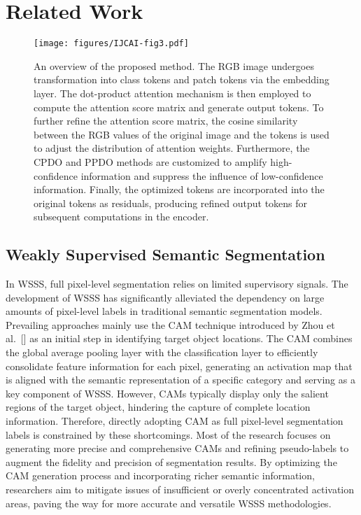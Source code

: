 \section{Related Work}
\begin{figure*}[t] 
    \centering
    \texttt{[image: figures/IJCAI-fig3.pdf]}
    \caption{An overview of the proposed method. The RGB image undergoes transformation into class tokens and patch tokens via the embedding layer. The dot-product attention mechanism is then employed to compute the attention score matrix and generate output tokens. To further refine the attention score matrix, the cosine similarity between the RGB values of the original image and the tokens is used to adjust the distribution of attention weights. Furthermore, the CPDO and PPDO methods are customized to amplify high-confidence information and suppress the influence of low-confidence information. Finally, the optimized tokens are incorporated into the original tokens as residuals, producing refined output tokens for subsequent computations in the encoder.
    }
    \label{Figure 3} 
    \end{figure*}

\subsection{Weakly Supervised Semantic Segmentation}

    In WSSS, full pixel-level segmentation relies on limited supervisory signals. The development of WSSS has significantly alleviated the dependency on large amounts of pixel-level labels in traditional semantic segmentation models. Prevailing approaches mainly use the CAM technique introduced by Zhou et al.~[\citeyear{zhou2016learning}] as an initial step in identifying target object locations. The CAM combines the global average pooling layer with the classification layer to efficiently consolidate feature information for each pixel, generating an activation map that is aligned with the semantic representation of a specific category and serving as a key component of WSSS. However, CAMs typically display only the salient regions of the target object, hindering the capture of complete location information. Therefore, directly adopting CAM as full pixel-level segmentation labels is constrained by these shortcomings. Most of the research focuses on generating more precise and comprehensive CAMs and refining pseudo-labels to augment the fidelity and precision of segmentation results. By optimizing the CAM generation process and incorporating richer semantic information, researchers aim to mitigate issues of insufficient or overly concentrated activation areas, paving the way for more accurate and versatile WSSS methodologies.

